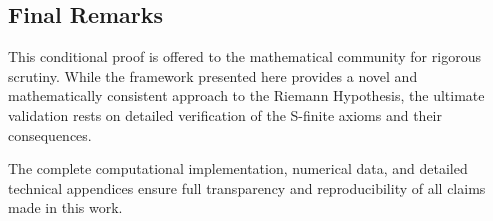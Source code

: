 \subsection{Final Remarks}

This conditional proof is offered to the mathematical community for rigorous scrutiny. While the framework presented here provides a novel and mathematically consistent approach to the Riemann Hypothesis, the ultimate validation rests on detailed verification of the S-finite axioms and their consequences.

The complete computational implementation, numerical data, and detailed technical appendices ensure full transparency and reproducibility of all claims made in this work.